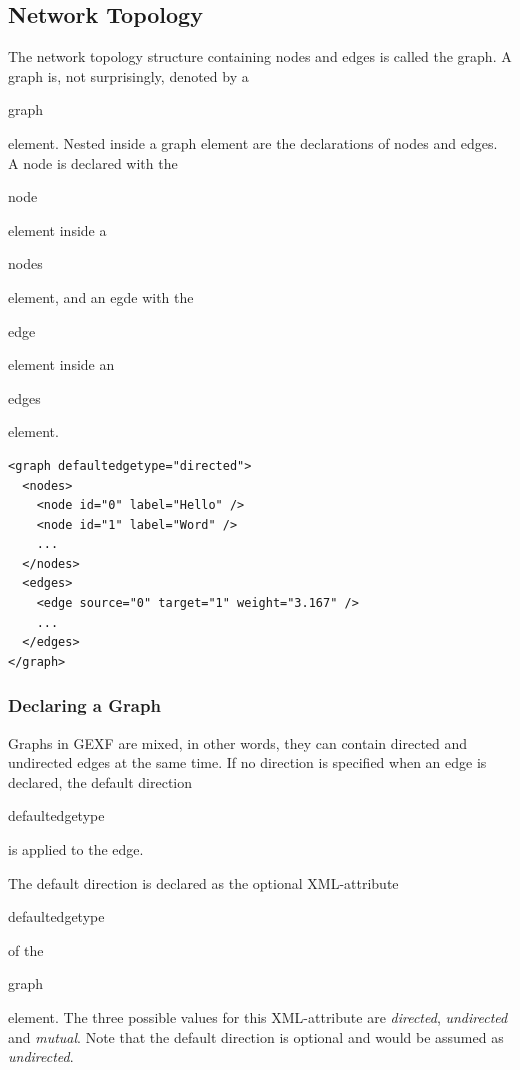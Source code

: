 \documentclass[a4paper,10pt]{article}
\begin{document}
\subsection{Network Topology} \label{networktopology}

The network topology structure containing nodes and edges is called the graph. A graph is, not surprisingly, denoted by a \begin{footnotesize}graph\end{footnotesize} element. Nested inside a graph element are the declarations of nodes and edges. A node is declared with the \begin{footnotesize}node\end{footnotesize} element inside a \begin{footnotesize}nodes\end{footnotesize} element, and an egde with the \begin{footnotesize}edge\end{footnotesize} element inside an \begin{footnotesize}edges\end{footnotesize} element.

\lstset{ style=gexf }
\begin{lstlisting}[caption={The definition of the graph},label=topology]
<graph defaultedgetype="directed">
  <nodes>
    <node id="0" label="Hello" />
    <node id="1" label="Word" />
    ...
  </nodes>
  <edges>
    <edge source="0" target="1" weight="3.167" />
    ...
  </edges>
</graph>
\end{lstlisting}

\subsubsection{Declaring a Graph}

Graphs in GEXF are mixed, in other words, they can contain directed and undirected edges at the same time. If no direction is specified when an edge is declared, the default direction \begin{footnotesize}defaultedgetype\end{footnotesize} is applied to the edge.

The default direction is declared as the optional XML-attribute \begin{footnotesize}defaultedgetype\end{footnotesize} of the \begin{footnotesize}graph\end{footnotesize} element. The three possible values for this XML-attribute are \textit{directed}, \textit{undirected} and \textit{mutual}. Note that the default direction is optional and would be assumed as \textit{undirected}.
\end{document}
